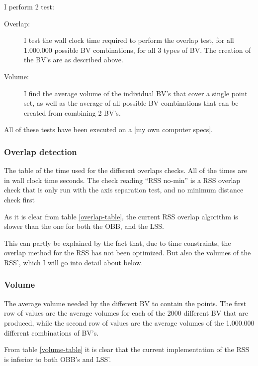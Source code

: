 I perform 2 test: 
\begin{description}
\item[Overlap:] I test the wall clock time required to perform the overlap test,
  for all 1.000.000 possible BV combinations, for all 3 types of BV. The creation of the BV's are as described above.  
\item[Volume:] I find the average volume of the individual BV's that cover a single point set, as well as the average of all possible BV combinations that can be created from combining 2 BV's.
\end{description}

All of these tests have been executed on a [my own computer specs].

\subsubsection{Overlap detection}

\begin{table}

\caption{\label{overlap-table}The table of the time used for the
  different overlaps checks. All of the times are in wall clock time seconds. The
  check reading ``RSS no-min'' is a RSS overlap check that is only run
with the axis separation test, and no minimum distance check first}
\end{table}

As it is clear from table \ref{overlap-table}, the current RSS overlap algorithm is slower than the one for both the OBB, and the LSS. 

This can partly be explained by the fact that, due to time constraints,
the overlap method for the RSS has not been optimized. But also the volumes of the RSS', which I will go into detail about below.

\subsubsection{Volume}
\label{volume-label}
\begin{table}

\caption{\label{volume-table} The average volume needed by the
  different BV to contain the points. The first row of values are the average
  volumes for each of the 2000 different BV that are produced, while
  the second row of values are the average volumes of the 1.000.000
  different combinations of BV's.}
\end{table}

From table \ref{volume-table} it is clear that the current implementation of the RSS is inferior to both OBB's and LSS'. 

